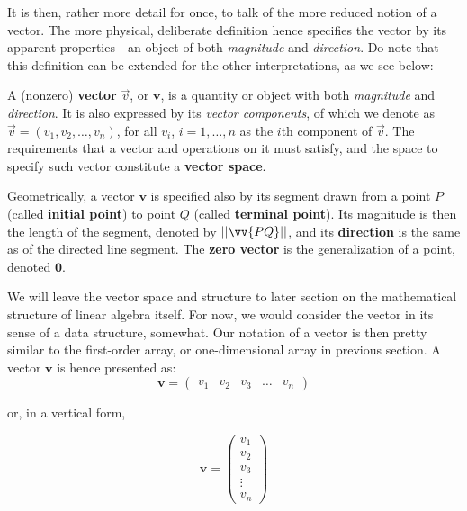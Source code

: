 It is then, rather more detail for once, to talk of the more reduced notion of a vector. The more physical, deliberate definition hence specifies the vector by its apparent properties - an object of both \textit{magnitude} and \textit{direction}. Do note that this definition can be extended for the other interpretations, as we see below: 
\begin{definition}[Vector]
    A (nonzero) \textbf{vector} $\vec{v}$, or $\mathbf{v}$, is a quantity or object with both \textit{magnitude} and \textit{direction}. It is also expressed by its \textit{vector components}, of which we denote as $\vec{v}=(v_1, v_2,\dots,v_n)$, for all $v_i$, $i=1,\dots,n$ as the $i$th component of $\vec{v}$. The requirements that a vector and operations on it must satisfy, and the space to specify such vector constitute a \textbf{vector space}. 

    Geometrically, a vector $\mathbf{v}$ is specified also by its segment drawn from a point $P$ (called \textbf{initial point}) to point $Q$ (called \textbf{terminal point}). Its magnitude is then the length of the segment, denoted by $\lvert\lvert \vv{PQ}\rvert \rvert$, and its \textbf{direction} is the same as of the directed line segment. The \textbf{zero vector} is the generalization of a point, denoted $\mathbf{0}$.
\end{definition}

We will leave the vector space and structure to later section on the mathematical structure of linear algebra itself. For now, we would consider the vector in its sense of a data structure, somewhat. Our notation of a vector is then pretty similar to the first-order array, or one-dimensional array in previous section. A vector $\mathbf{v}$ is hence presented as: 
\begin{equation}
    \mathbf{v} = \begin{pmatrix}
        v_{1} & v_{2} & v_{3} & \dots & v_{n}
    \end{pmatrix}
\end{equation}

or, in a vertical form, 

\begin{equation}
    \mathbf{v} = \begin{pmatrix}
        v_{1} \\
        v_{2} \\ 
        v_{3} \\
        \vdots \\
        v_{n} 
    \end{pmatrix}
\end{equation}

